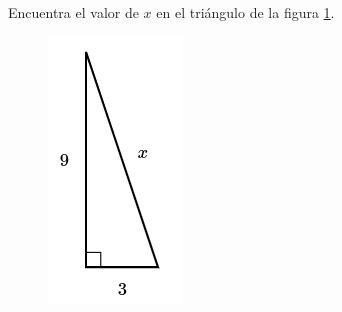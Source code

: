 Encuentra el valor de $x$ en el triángulo de la figura \ref{fig:lados_pitagoras_07}.

\begin{minipage}[t][][t]{0.35\textwidth}
    \begin{figure}[H]
        \centering
        \includegraphics[width=0.6\linewidth]{../images/lados_pitagoras_07.png}

        \caption{}
        \label{fig:lados_pitagoras_07}
    \end{figure}
\end{minipage}\hfill
\begin{minipage}[t][][t]{0.6\textwidth}
    \begin{solutionbox}{8cm}

    \end{solutionbox}
\end{minipage}
